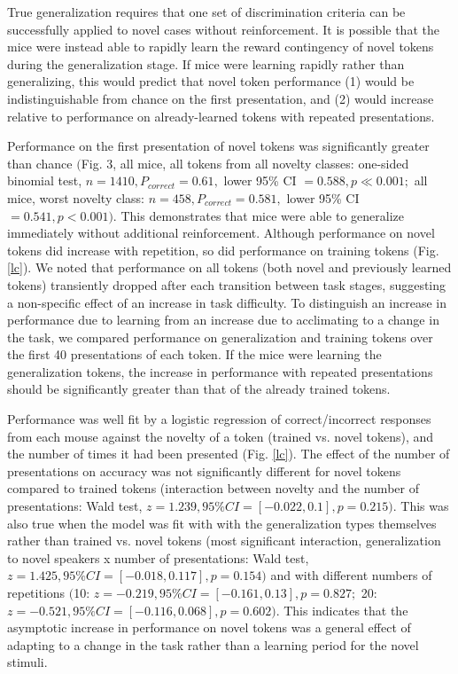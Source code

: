 True generalization requires that one set of discrimination criteria can be successfully applied to novel cases without reinforcement. It is possible that the mice were instead able to rapidly learn the reward contingency of novel tokens during the generalization stage. If mice were learning rapidly rather than generalizing, this would predict that novel token performance (1) would be indistinguishable from chance on the first presentation, and (2) would increase relative to performance on already-learned tokens with repeated presentations.

Performance on the first presentation of novel tokens was significantly greater than chance $($Fig. 3, all mice, all tokens from all novelty classes: one-sided binomial test, $n=1410, P_{correct} = 0.61,$ lower 95\% CI $= 0.588, p \ll 0.001;$ all mice, worst novelty class:  $n=458, P_{correct} = 0.581,$ lower 95\% CI $= 0.541, p < 0.001)$. This demonstrates that mice were able to generalize immediately without additional reinforcement. Although performance on novel tokens did increase with repetition, so did performance on training tokens (Fig. \ref{lc}). We noted that performance on all tokens (both novel and previously learned tokens) transiently dropped after each transition between task stages, suggesting a non-specific effect of an increase in task difficulty. To distinguish an increase in performance due to learning from an increase due to acclimating to a change in the task, we compared performance on generalization and training tokens over the first 40 presentations of each token. If the mice were learning the generalization tokens, the increase in performance with repeated presentations should be significantly greater than that of the already trained tokens.

Performance was well fit by a logistic regression of correct/incorrect responses from each mouse against the novelty of a token (trained vs. novel tokens), and the number of times it had been presented (Fig. \ref{lc}). The effect of the number of presentations on accuracy was not significantly different for novel tokens compared to trained tokens (interaction between novelty and the number of presentations: Wald test, $z = 1.239, 95\% CI = [-0.022, 0.1], p=0.215)$. This was also true when the model was fit with with the generalization types themselves rather than trained vs. novel tokens (most significant interaction, generalization to novel speakers x number of presentations: Wald test, $z = 1.425, 95\% CI = [-0.018, 0.117], p=0.154)$ and with different numbers of repetitions $($10: $z = -0.219, 95\% CI = [-0.161, 0.13], p=0.827;$ 20: $z = -0.521, 95\% CI = [-0.116, 0.068], p=0.602)$. This indicates that the asymptotic increase in performance on novel tokens was a general effect of adapting to a change in the task rather than a learning period for the novel stimuli.

